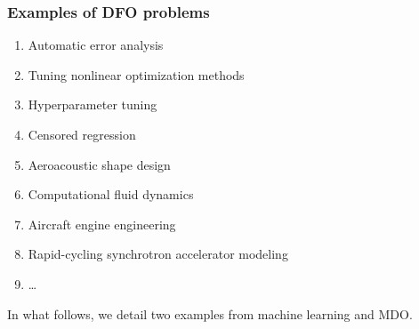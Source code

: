 \documentclass{polyu-presentation}
\begin{document}
\begin{frame}
    \frametitle{Examples of DFO problems}

    \begin{enumerate}
        \item Automatic error analysis \parencite{Higham_1993,Higham_2002}
        \item Tuning nonlinear optimization methods \parencite{Audet_Orban_2006}
        \item \alert<2>{Hyperparameter tuning} \parencite{Ghanbari_Scheinberg_2017}
        \item Censored regression \parencite{Chen_Etal_2018}
        \item Aeroacoustic shape design \parencite{Marsden_2004,Marsden_Etal_2004}
        \item Computational fluid dynamics \parencite{Duvigneau_Visonneau_2004}
        \item \alert<2>{Aircraft engine engineering}~\parencite{Gazaix_Etal_2019}
        \item Rapid-cycling synchrotron accelerator modeling \parencite{Eldred_Etal_2022}
        \item \dots
    \end{enumerate}

    \medskip

    \pause
    \begin{block}{}
        In what follows, we detail two examples from \alert{machine learning} and \alert{MDO}.
    \end{block}
\end{frame}
\end{document}
